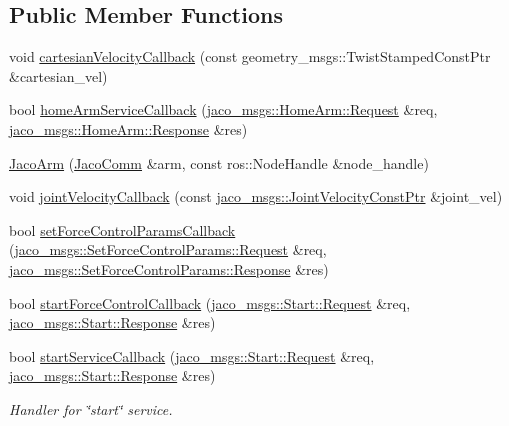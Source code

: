 \subsection*{Public Member Functions}
\begin{DoxyCompactItemize}
\item 
void \hyperlink{classjaco_1_1JacoArm_a091f2eaffef84362f69e3b49482982db}{cartesian\+Velocity\+Callback} (const geometry\+\_\+msgs\+::\+Twist\+Stamped\+Const\+Ptr \&cartesian\+\_\+vel)
\item 
bool \hyperlink{classjaco_1_1JacoArm_a0296802ee4994977c35532077dd28a44}{home\+Arm\+Service\+Callback} (\hyperlink{namespacejaco__msgs_a9ec1a0126f783da04c0c07f2142c54e8}{jaco\+\_\+msgs\+::\+Home\+Arm\+::\+Request} \&req, \hyperlink{namespacejaco__msgs_a73b7d664d9eb1b07a5e5eebf08b4b444}{jaco\+\_\+msgs\+::\+Home\+Arm\+::\+Response} \&res)
\item 
\hyperlink{classjaco_1_1JacoArm_ab29d25cb3b4bafdc523cbe271c801681}{Jaco\+Arm} (\hyperlink{classjaco_1_1JacoComm}{Jaco\+Comm} \&arm, const ros\+::\+Node\+Handle \&node\+\_\+handle)
\item 
void \hyperlink{classjaco_1_1JacoArm_a2c2cfc44e480845bbf7e78c6bfe454b6}{joint\+Velocity\+Callback} (const \hyperlink{namespacejaco__msgs_aab606d270e36965850c5e08ce8073242}{jaco\+\_\+msgs\+::\+Joint\+Velocity\+Const\+Ptr} \&joint\+\_\+vel)
\item 
bool \hyperlink{classjaco_1_1JacoArm_a7a5b8120d770ed6ab0bd4593213de712}{set\+Force\+Control\+Params\+Callback} (\hyperlink{namespacejaco__msgs_a9960faf4239c20b2de273631be129dc2}{jaco\+\_\+msgs\+::\+Set\+Force\+Control\+Params\+::\+Request} \&req, \hyperlink{namespacejaco__msgs_a06150f3690c6e365126010e9874be430}{jaco\+\_\+msgs\+::\+Set\+Force\+Control\+Params\+::\+Response} \&res)
\item 
bool \hyperlink{classjaco_1_1JacoArm_a6c96a5dcf017d0b054048e7765cd3f38}{start\+Force\+Control\+Callback} (\hyperlink{namespacejaco__msgs_a90e69ae86033a05c547300c6c7759df5}{jaco\+\_\+msgs\+::\+Start\+::\+Request} \&req, \hyperlink{namespacejaco__msgs_a6efcf3689af0dcd0ac318ef8ffdc1f79}{jaco\+\_\+msgs\+::\+Start\+::\+Response} \&res)
\item 
bool \hyperlink{classjaco_1_1JacoArm_a0b59f245a5ca363c52dcbc211f20fa64}{start\+Service\+Callback} (\hyperlink{namespacejaco__msgs_a90e69ae86033a05c547300c6c7759df5}{jaco\+\_\+msgs\+::\+Start\+::\+Request} \&req, \hyperlink{namespacejaco__msgs_a6efcf3689af0dcd0ac318ef8ffdc1f79}{jaco\+\_\+msgs\+::\+Start\+::\+Response} \&res)
\begin{DoxyCompactList}\small\item\em Handler for \char`\"{}start\char`\"{} service. \end{DoxyCompactList}\item 

\end{DoxyCompactItemize}
